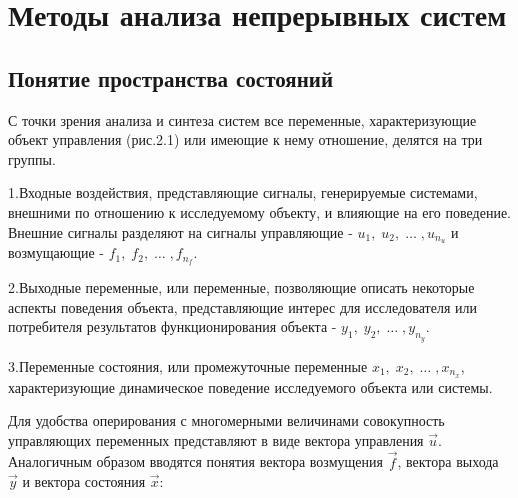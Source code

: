 \chapter{Методы анализа непрерывных систем}
\section{Понятие пространства состояний}


		С точки зрения анализа и синтеза систем все переменные, характеризующие объект управления (рис.2.1) или имеющие к нему
		отношение, делятся на три группы.



\bigskip


\bigskip


		1.Входные воздействия, представляющие сигналы, генерируемые сис­темами, внешними по отношению к исследуемому объекту, и
		влияющие на его поведение. Внешние сигналы разделяют на сигналы управляющие -  $u_1,\;u_2,\;\ldots \;,u_{n_u}$ и
		возмущающие -  $f_1,\;f_2,\;\ldots \;,f_{n_f}$.



		2.Выходные переменные, или переменные, позволяющие описать не­которые аспекты поведения объекта, представляющие интерес
		для иссле­дователя или потребителя результатов функционирования объекта -\textsubscript{ } $y_1,\;y_2,\;\ldots
		\;,y_{n_y}$.



		3.Переменные состояния, или промежуточные переменные  $x_1,\;x_2,\;\ldots \;,x_{n_x}$, характеризующие динамическое
		поведение исследуемого объек­та или системы.



		Для удобства оперирования с многомерными величинами совокупность управляющих переменных представляют в виде вектора
		управления  $\vec u$. Аналогичным образом вводятся понятия вектора возмущения  $\vec f$, вектора выхода  $\vec y$ и
		вектора состояния  $\vec x$:



\bigskip


